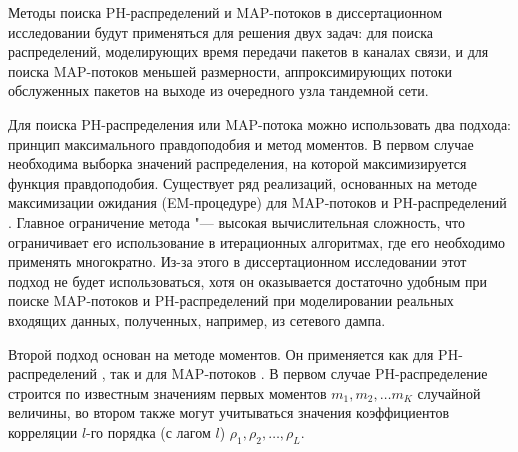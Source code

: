 Методы поиска PH-распределений и MAP-потоков в диссертационном исследовании будут применяться для решения двух задач: для поиска распределений, моделирующих время передачи пакетов в каналах связи, и для поиска MAP-потоков меньшей размерности, аппроксимирующих потоки обслуженных пакетов на выходе из очередного узла тандемной сети.

Для поиска PH-распределения или MAP-потока можно использовать два подхода: принцип максимального правдоподобия и метод моментов. В первом случае необходима выборка значений распределения, на которой максимизируется функция правдоподобия. Существует ряд реализаций, основанных на методе максимизации ожидания (EM-процедуре) для MAP-потоков \cite{Horvath2013,Ephraim2009,Buchholz2003,Okamura2009} и PH-распределений \cite{Asmussen1996,Bobbio1992,Thummler2005,Okamura2013,Okamura2011,ElAbdouniKhayari2003}. Главное ограничение метода "--- высокая вычислительная сложность, что ограничивает его использование в итерационных алгоритмах, где его необходимо применять многократно. Из-за этого в диссертационном исследовании этот подход не будет использоваться, хотя он оказывается достаточно удобным при поиске MAP-потоков и PH-распределений при моделировании реальных входящих данных, полученных, например, из сетевого дампа.

Второй подход основан на методе моментов. Он применяется как для PH-распределений \cite{Osogami2006,Bobbio2005,Johnson1989,Telek2003,Horvath2013,VandenBosch2000,Horvath2007,Schmickler1992}, так и для MAP-потоков \cite{TelekHorvath2007,Bodrog2010,Bodrog2008,Horvath2005,Schmickler1992,Casale2010}. В первом случае PH-распределение строится по известным значениям первых моментов $m_1, m_2, \dots m_K$ случайной величины, во втором также могут учитываться значения коэффициентов корреляции $l$-го порядка (с лагом $l$) $\rho_1, \rho_2, \dots, \rho_L$.

